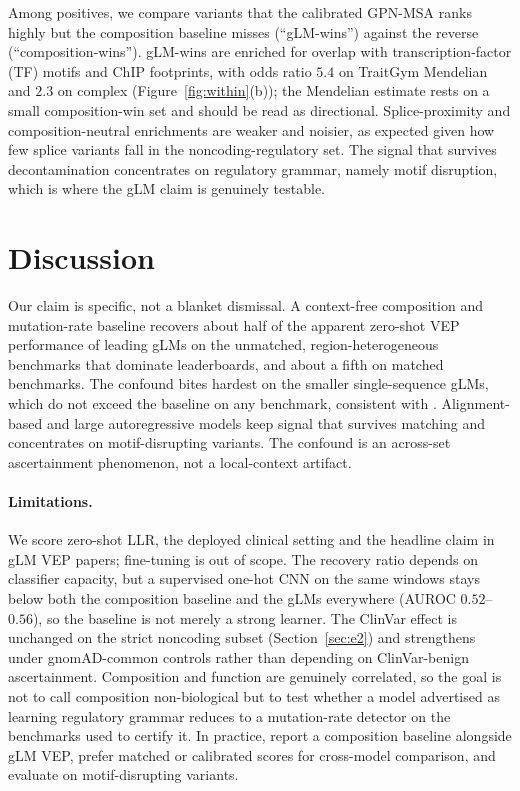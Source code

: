 \documentclass[pmlr]{jmlr}
\begin{document}
Among positives, we compare variants that the calibrated GPN-MSA ranks highly but the
composition baseline misses (``gLM-wins'') against the reverse (``composition-wins'').
gLM-wins are enriched for overlap with transcription-factor (TF) motifs and ChIP footprints,
with odds ratio $5.4$ on TraitGym Mendelian and $2.3$ on complex (Figure~\ref{fig:within}(b));
the Mendelian estimate rests on a small composition-win set and should be read as
directional. Splice-proximity and
composition-neutral enrichments are weaker and noisier, as expected given how few splice
variants fall in the noncoding-regulatory set. The signal that survives decontamination
concentrates on regulatory grammar, namely motif disruption, which is where the gLM claim is
genuinely testable.

\section{Discussion}
\label{sec:discussion}

Our claim is specific, not a blanket dismissal. A context-free composition and mutation-rate
baseline recovers about half of the apparent zero-shot VEP performance of leading gLMs on the
unmatched, region-heterogeneous benchmarks that dominate leaderboards, and about a fifth on
matched benchmarks. The confound bites hardest on the smaller single-sequence gLMs, which do
not exceed the baseline on any benchmark, consistent with \citet{tang2025koo}. Alignment-based
and large autoregressive models keep signal that survives matching and concentrates on
motif-disrupting variants. The confound is an across-set ascertainment phenomenon, not a
local-context artifact.

\paragraph{Limitations.} We score zero-shot LLR, the deployed clinical setting and the
headline claim in gLM VEP papers; fine-tuning is out of scope. The recovery ratio depends on
classifier capacity, but a supervised one-hot CNN on the same windows stays below both the
composition baseline and the gLMs everywhere (AUROC $0.52$--$0.56$), so the baseline is not
merely a strong learner. The ClinVar effect is unchanged on the strict noncoding subset
(Section~\ref{sec:e2}) and strengthens under gnomAD-common controls rather than depending on
ClinVar-benign ascertainment. Composition and function are genuinely correlated, so the goal is
not to call composition
non-biological but to test whether a model advertised as learning regulatory grammar reduces
to a mutation-rate detector on the benchmarks used to certify it. In practice, report a
composition baseline alongside gLM VEP, prefer matched or calibrated scores for cross-model
comparison, and evaluate on motif-disrupting variants.
\end{document}
